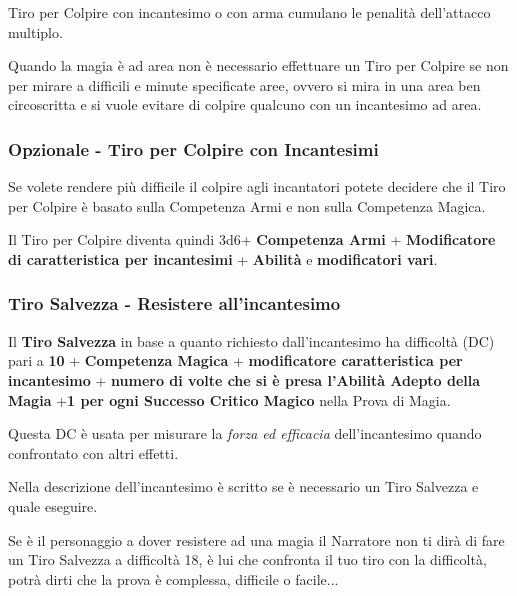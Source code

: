 \begin{multicols}{2}
Tiro per Colpire con incantesimo o con arma cumulano le penalità dell'attacco multiplo.

\medskip

Quando la magia è ad area non è necessario effettuare un Tiro per Colpire se non per mirare a difficili e minute specificate aree, ovvero si mira in una area ben circoscritta e si vuole evitare di colpire qualcuno con un incantesimo ad area.

\subsubsection{Opzionale - Tiro per Colpire con Incantesimi}

Se volete rendere più difficile il colpire agli incantatori potete decidere che il Tiro per Colpire è basato sulla Competenza Armi e non sulla Competenza Magica.

Il Tiro per Colpire diventa quindi 3d6+ \textbf{Competenza Armi} + \textbf{Modificatore di caratteristica per incantesimi} + \textbf{Abilità} e \textbf{modificatori vari}.

\subsubsection{Tiro Salvezza - Resistere all'incantesimo}\label{magietirosalvezza}\hypertarget{magietirosalvezza}{}

Il \textbf{Tiro Salvezza} in base a quanto richiesto dall'incantesimo ha difficoltà (DC) pari a \textbf{10} + \textbf{Competenza Magica} + \textbf{modificatore caratteristica per incantesimo} + \textbf{numero di volte che si è presa l'Abilità Adepto della Magia} +\textbf{1 per ogni Successo Critico Magico} nella Prova di Magia.

Questa DC è usata per misurare la \emph{forza ed efficacia} dell'incantesimo quando confrontato con altri effetti.

Nella descrizione dell'incantesimo è scritto se è necessario un Tiro Salvezza e quale eseguire.

Se è il personaggio a dover resistere ad una magia il Narratore non ti dirà di fare un Tiro Salvezza a difficoltà 18, è lui che confronta il tuo tiro con la difficoltà, potrà dirti che la prova è complessa, difficile o facile...

\begin{itemize}[leftmargin=*] \setlength{\itemsep}{0pt}


\end{itemize}
\end{multicols}
